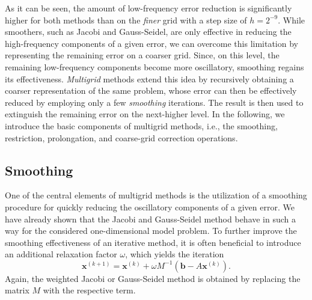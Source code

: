 As it can be seen, the amount of low-frequency error reduction is significantly higher for both methods than on the \emph{finer} grid with a step size of $h = 2^{-9}$.
While smoothers, such as Jacobi and Gauss-Seidel, are only effective in reducing the high-frequency components of a given error, we can overcome this limitation by representing the remaining error on a coarser grid.
Since, on this level, the remaining low-frequency components become more oscillatory, smoothing regains its effectiveness. 
\emph{Multigrid} methods extend this idea by recursively obtaining a coarser representation of the same problem, whose error can then be effectively reduced by employing only a few \emph{smoothing} iterations.
The result is then used to extinguish the remaining error on the next-higher level.
In the following, we introduce the basic components of multigrid methods, i.e., the smoothing, restriction, prolongation, and coarse-grid correction operations.
\subsection{Smoothing}
\label{subsec:smoothing}
One of the central elements of multigrid methods is the utilization of a smoothing procedure for quickly reducing the oscillatory components of a given error.
We have already shown that the Jacobi and Gauss-Seidel method behave in such a way for the considered one-dimensional model problem.
To further improve the smoothing effectiveness of an iterative method, it is often beneficial to introduce an additional relaxation factor $\omega$, which yields the iteration 
\begin{equation}
	\bm{x}^{(k+1)} = \bm{x}^{(k)} + \omega M^{-1}(\bm b - A \bm{x}^{(k)}).
	\label{eq:general-weighted-stationary-iterative-method}
\end{equation}
Again, the weighted Jacobi or Gauss-Seidel method is obtained by replacing the matrix $M$ with the respective term.
